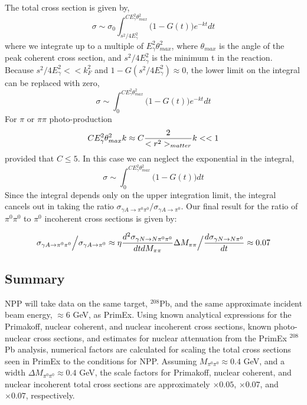 The total cross section is given by, 
$$\sigma \sim \sigma_0 \int^{C E^2_\gamma \theta^2_{max}}_{s^2/4E^2_\gamma} \Big( 1 - G(t) \Big) e^{-kt} dt  $$
where we integrate up to a multiple of $E_\gamma^2 \theta_{max}^2$, where $\theta_{max}$  is the angle of the peak coherent cross section, and $s^2/4E^2_\gamma$ is the minimum t in the reaction.  
Because $s^2/4E^2_\gamma << k^2_F$ and $1-G(s^2/4E^2_\gamma) \approx 0$, the lower limit on the integral can be replaced with zero, 
$$\sigma \sim \int^{CE^2_\gamma \theta^2_{max}}_0 \Big( 1 - G(t) \Big) e^{-kt}  dt $$
For $\pi$ or $\pi \pi$ photo-production 
$$ C  E^2_\gamma \theta^2_{max} k \approx C  { 2 \over <r^2>_{matter} } k << 1 $$
provided that $C \le 5$. In this case we can neglect the exponential in the integral, 
$$\sigma \sim \int^{C E^2_\gamma \theta^2_{max}}_0 \Big( 1 - G(t) \Big) dt $$
Since the integral depends only on the upper integration limit,   the integral  cancels out in taking the ratio $ \sigma_{\gamma A \rightarrow  \pi^0 \pi^0}  \Big/ \sigma_{\gamma A \rightarrow  \pi^0} $. 
Our final result for the ratio of  $\pi^0 \pi^0$ to $\pi^0$ incoherent cross sections is given by: 

$$  \sigma_{\gamma A \rightarrow  \pi^0 \pi^0}  \Big/ \sigma_{\gamma A \rightarrow  \pi^0}  \approx \eta 
 {d^2\sigma_{\gamma N \rightarrow N \pi^0 \pi^0} \over dt dM_{\pi \pi} }  \Delta M_{\pi \pi}\Big/ { d\sigma_{\gamma N \rightarrow N \pi^0} \over dt} \approx 0.07 $$

\subsection{Summary}
NPP will take data on the same target, $^{208}$Pb, and the same approximate incident beam energy, $\approx 6$ GeV, as PrimEx. Using known analytical expressions for the Primakoff, nuclear coherent, and nuclear incoherent cross sections, known photo-nuclear cross sections, and estimates for nuclear attenuation from the PrimEx $^{208}$Pb analysis, numerical factors are calculated for scaling the total cross sections seen in PrimEx to the 
conditions for NPP.  Assuming $M_{\pi^0 \pi^0} \approx 0.4$ GeV, and a width  $\Delta M_{\pi^0 \pi^0} \approx 0.4$ GeV, the scale factors for Primakoff, nuclear coherent, and nuclear incoherent total cross sections are approximately $\times 0.05$, $\times 0.07$, and $\times 0.07$, respectively. 

